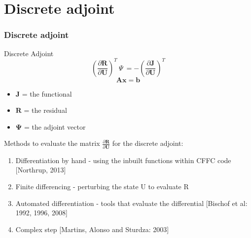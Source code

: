 \documentclass{beamer}
\begin{document}

\section{Discrete adjoint}
\begin{frame}
\frametitle{Discrete adjoint}
\scriptsize
\begin{minipage}[t][1\textheight]{1\textwidth}
\vspace{-15pt}
\begin{exampleblock}{Discrete Adjoint}
\vspace{-8pt}
\[\left( \frac{\partial{\mathbf{R}}}{\partial{\mathbf{U}}} \right)^T ~\Psi~ = -\left( \frac{\partial{\mathbf{J}}}{\partial{\mathbf{U}}} \right)^T\]
\vspace{-10pt}
\[\mathbf{Ax} = \mathbf{b}\] %
\begin{itemize}
\tiny
\item \textbf{$\mathbf{J}$} = the functional
\item \textbf{$\mathbf{R}$} =  the residual
\item \textbf{$\mathbf{\Psi}$} = the adjoint vector
\end{itemize}
\end{exampleblock}

\vspace{0pt}
Methods to evaluate the matrix $\frac{\partial{\mathbf{R}}}{\partial{\mathbf{U}}} $  for the discrete adjoint:
\vspace{2pt}
\begin{enumerate}[1.]
\tiny
\item Differentiation by hand  - using the inbuilt functions within CFFC code [Northrup, 2013]
\item Finite differencing - perturbing the state U to evaluate R 
\item Automated differentiation - tools that evaluate the differential [Bischof et al: 1992, 1996, 2008]
\item Complex step [Martins, Alonso and Sturdza: 2003]
\end{enumerate}
\end{minipage}


\end{frame}


\end{document}
